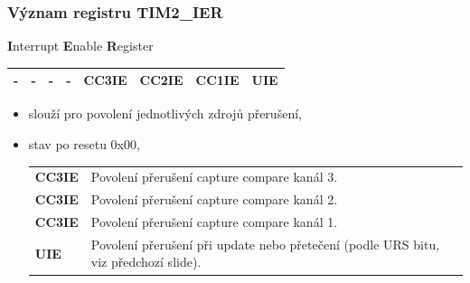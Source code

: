 	\begin{frame}
    \frametitle{Význam registru TIM2\_IER}

		\textbf{I}nterrupt \textbf{E}nable \textbf{R}egister

		\begin{center}
			\tiny
			\begin{tabular}{| p{9mm} | p{9mm} | p{9mm} | p{9mm} | p{9mm} | p{9mm} | p{9mm} | p{9mm} |}
				\hline
				\hline
				\textbf{-} & \textbf{-} & \textbf{-} & \textbf{-} & \textbf{CC3IE} & \textbf{CC2IE} & \textbf{CC1IE} & \textbf{UIE} \\
				\hline
				\hline
			\end{tabular}
		\end{center}
				
		\begin{itemize}
			\item slouží pro povolení jednotlivých zdrojů přerušení,
			\item stav po resetu 0x00,
			\small
			\begin{center}
				\begin{tabular}{l p{80mm}}
					\textbf{CC3IE} & Povolení přerušení capture compare kanál 3. \\
					\textbf{CC3IE} & Povolení přerušení capture compare kanál 2.  \\
					\textbf{CC3IE} & Povolení přerušení capture compare kanál 1. \\
					\textbf{UIE} & Povolení přerušení při update nebo přetečení (podle URS bitu, viz předchozí slide).
				\end{tabular}
			\end{center}
		\end{itemize}
		
	\end{frame}
	
